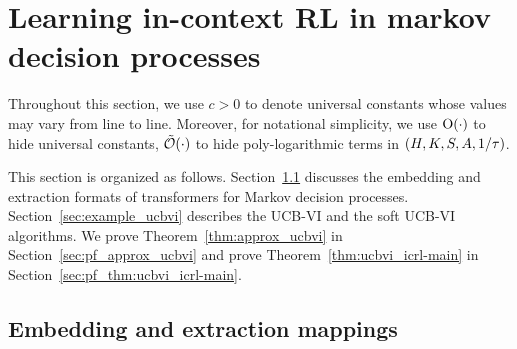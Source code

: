 \section{Learning in-context RL in markov decision processes}






















Throughout this section, we use $c>0$ to denote universal constants whose values may vary from line to line.
Moreover, for notational simplicity, we use ${\mathrm{O}}(\cdot)$ to hide universal constants,  ${\tilde{\mathcal O}}(\cdot)$ to hide poly-logarithmic terms in $({H},{K},{S},{A},1/{\tau})$.


This section is organized as follows. Section~\ref{sec:tf_embed_mdp} discusses the embedding and extraction formats of transformers for Markov decision processes. Section~\ref{sec:example_ucbvi} describes the UCB-VI and the soft UCB-VI algorithms.  We prove Theorem~\ref{thm:approx_ucbvi} in Section~\ref{sec:pf_approx_ucbvi} and prove Theorem~\ref{thm:ucbvi_icrl-main} in Section~\ref{sec:pf_thm:ucbvi_icrl-main}.













\subsection{Embedding and extraction mappings}\label{sec:tf_embed_mdp}

